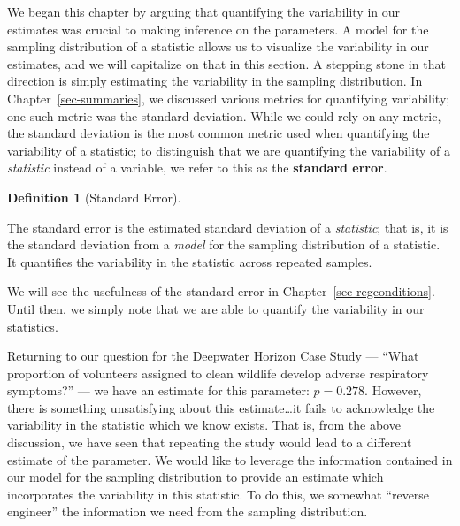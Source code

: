 \documentclass[
  letterpaper,
  DIV=11,
  numbers=noendperiod]{scrreprt}
\theoremstyle{definition}
\newtheorem{definition}{Definition}[chapter]
\theoremstyle{definition}
\theoremstyle{plain}
\theoremstyle{remark}
\begin{document}
We began this chapter by arguing that quantifying the variability in our
estimates was crucial to making inference on the parameters. A model for
the sampling distribution of a statistic allows us to visualize the
variability in our estimates, and we will capitalize on that in this
section. A stepping stone in that direction is simply estimating the
variability in the sampling distribution. In
Chapter~\ref{sec-summaries}, we discussed various metrics for
quantifying variability; one such metric was the standard deviation.
While we could rely on any metric, the standard deviation is the most
common metric used when quantifying the variability of a statistic; to
distinguish that we are quantifying the variability of a
\emph{statistic} instead of a variable, we refer to this as the
\textbf{standard error}.

\begin{definition}[Standard
Error]\protect\hypertarget{def-standard-error}{}\label{def-standard-error}

The standard error is the estimated standard deviation of a
\emph{statistic}; that is, it is the standard deviation from a
\emph{model} for the sampling distribution of a statistic. It quantifies
the variability in the statistic across repeated samples.

\end{definition}

We will see the usefulness of the standard error in
Chapter~\ref{sec-regconditions}. Until then, we simply note that we are
able to quantify the variability in our statistics.

Returning to our question for the Deepwater Horizon Case Study ---
``What proportion of volunteers assigned to clean wildlife develop
adverse respiratory symptoms?'' --- we have an estimate for this
parameter: \(\widehat{p} = 0.278\). However, there is something
unsatisfying about this estimate\ldots it fails to acknowledge the
variability in the statistic which we know exists. That is, from the
above discussion, we have seen that repeating the study would lead to a
different estimate of the parameter. We would like to leverage the
information contained in our model for the sampling distribution to
provide an estimate which incorporates the variability in this
statistic. To do this, we somewhat ``reverse engineer'' the information
we need from the sampling distribution.
\end{document}
